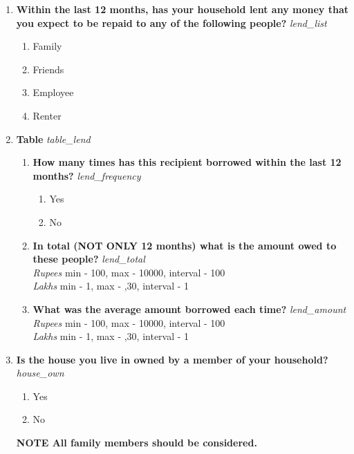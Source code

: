 \documentclass{article}
\begin{document}
\begin{enumerate}
\begin{enumerate}
\end{enumerate}
\item {\bfseries Within the last 12 months, has your household lent any money that you expect to be repaid to any of the following people?}\emph{ lend\_list }
\begin{enumerate}
\item Family
\item Friends
\item Employee
\item Renter
\end{enumerate}
\item {\bfseries Table}\emph{ table\_lend }
\begin{enumerate}[label*=\arabic*.]
\item {\bfseries How many times has this recipient borrowed within the last 12 months?}\emph{ lend\_frequency }
\begin{enumerate}
\item Yes
\item No
\end{enumerate}
\item {\bfseries In total (NOT ONLY 12 months) what is the amount owed to these people?}\emph{ lend\_total }
\\ \emph{ Rupees }min - 100, max - 10000, interval - 100
\\ \emph{ Lakhs }min - 1, max - ,30, interval - 1

\item {\bfseries What was the average amount borrowed each time? }\emph{ lend\_amount }
\\ \emph{ Rupees }min - 100, max - 10000, interval - 100
\\ \emph{ Lakhs }min - 1, max - ,30, interval - 1

\end{enumerate}
\item {\bfseries Is the house you live in owned by a member of your household?}\emph{ house\_own }
\begin{enumerate}
\item Yes
\item No
\end{enumerate}\textbf{{\footnotesize NOTE} All family members should be considered. }


\end{enumerate}
\end{document}
